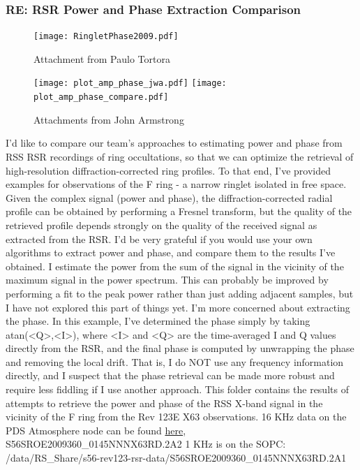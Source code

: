 \documentclass[crop=false,class=article,oneside]{standalone}
\begin{document}
\subsubsection{\footnotesize RE: RSR Power and Phase Extraction Comparison}
\begin{figure}[H]
    \centering
    \captionsetup{type=figure}
    \texttt{[image: RingletPhase2009.pdf]}
    \caption{Attachment from Paulo Tortora}
\end{figure}
\begin{figure}[H]
    \centering
    \captionsetup{type=figure}
    \texttt{[image: plot\_amp\_phase\_jwa.pdf]}
    \hfill
    \texttt{[image: plot\_amp\_phase\_compare.pdf]}
    \caption{Attachments from John Armstrong}
\end{figure}
I'd like to compare our team's approaches to estimating power and phase from RSS RSR recordings of ring occultations, so that we can optimize the retrieval of high-resolution diffraction-corrected ring profiles. To that end, I've provided examples for observations of the F ring - a narrow ringlet isolated in free space. Given the complex signal (power and phase), the diffraction-corrected radial profile can be obtained by performing a Fresnel transform, but the quality of the retrieved profile depends strongly on the quality of the received signal as extracted from the RSR. I'd be very grateful if you would use your own algorithms to extract power and phase, and compare them to the results I've obtained. I estimate the power from the sum of the signal in the vicinity of the maximum signal in the power spectrum. This can probably be improved by performing a fit to the peak power rather than just adding adjacent samples, but I have not explored this part of things yet. I'm more concerned about extracting the phase. In this example, I've determined the phase simply by taking atan(<Q>,<I>), where <I> and <Q> are the time-averaged I and Q values directly from the RSR, and the final phase is computed by unwrapping the phase and removing the local drift. That is, I do NOT use any frequency information directly, and I suspect that the phase retrieval can be made more robust and require less fiddling if I use another approach. This folder contains the results of attempts to retrieve the power and phase of the RSS X-band signal in the vicinity of the F ring from the Rev 123E X63 observations. 16 KHz data on the PDS Atmosphere node can be found \href{https://pds-atmospheres.nmsu.edu/cgi-bin/getdir.pl?volume=cors_0302&dir=SROC10_359/RSR}{here}, S56SROE2009360\_0145NNNX63RD.2A2
1 KHz is on the SOPC: /data/RS\_Share/s56-rev123-rsr-data/S56SROE2009360\_0145NNNX63RD.2A1
\end{document}
